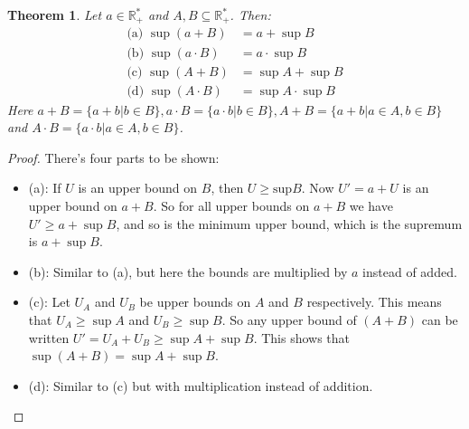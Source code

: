 \documentclass[12pt, a4paper]{article}
\newtheorem{theorem}{Theorem}[section]
\numberwithin{equation}{section}
\begin{document}
\begin{theorem}
\label{suprema_sets}
Let $a\in\mathbb{R}_+^*$ and $A,B\subseteq\mathbb{R}_+^*$. Then:
\begin{align}
\textrm{(a) }\sup(a+B)&=a+\sup B\\
\textrm{(b) }\sup(a\cdot B)&=a\cdot\sup B\\
\textrm{(c) }\sup(A+B)&=\sup A+\sup B\\
\textrm{(d) }\sup(A\cdot B)&=\sup A\cdot\sup B
\end{align}
Here $a+B=\{a+b|b\in B\}, a\cdot B=\{a\cdot b|b\in B\}, A+B=\{a+b|a\in A, b\in B\}$ and $A\cdot B=\{a\cdot b|a\in A, b\in B\}$.
\end{theorem}
\begin{proof}
There's four parts to be shown:
\begin{itemize}
\item (a): If $U$ is an upper bound on $B$, then $U\ge\textrm{sup}B$. Now $U'=a+U$ is an upper bound on $a+B$. So for all upper bounds on $a+B$ we have $U'\ge a+\sup B$, and so is the minimum upper bound, which is the supremum is $a+\sup B$.
\item (b): Similar to (a), but here the bounds are multiplied by $a$ instead of added.
\item (c): Let $U_A$ and $U_B$ be upper bounds on $A$ and $B$ respectively. This means that $U_A\ge\sup A$ and $U_B\ge\sup B$. So any upper bound of $(A+B)$ can be written $U'=U_A+U_B\ge\sup A+\sup B$. This shows that $\sup (A+B)=\sup A+\sup B$.
\item (d): Similar to (c) but with multiplication instead of addition.
\end{itemize}
\end{proof}
\end{document}
